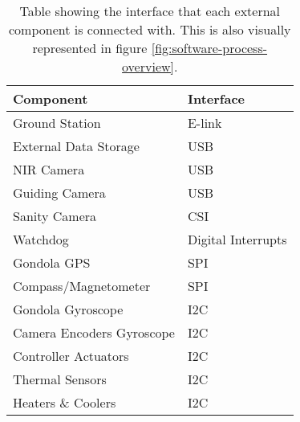 \begin{table}[H]
	\centering
	\begin{tabular}{l|l}
		\textbf{Component}
		& \textbf{Interface} \\ \hline
		Ground Station
		& E-link             \\
		External Data Storage
		& USB            	 \\
		NIR Camera
		& USB                \\
		Guiding Camera
		& USB                \\
		Sanity Camera
		& CSI                \\
		Watchdog
		& Digital Interrupts \\
		Gondola GPS
		& SPI                \\
		Compass/Magnetometer
		& SPI                \\
		Gondola Gyroscope
		& I2C                \\
		Camera Encoders Gyroscope
		& I2C                \\
		Controller Actuators
		& I2C                \\
		Thermal Sensors
		& I2C				 \\
		Heaters \& Coolers
		& I2C
	\end{tabular}
	\caption{Table showing the interface that each external component is connected with. This is also visually represented in figure \ref{fig:software-process-overview}.}
	\label{tab:software-interfaces}
\end{table}
